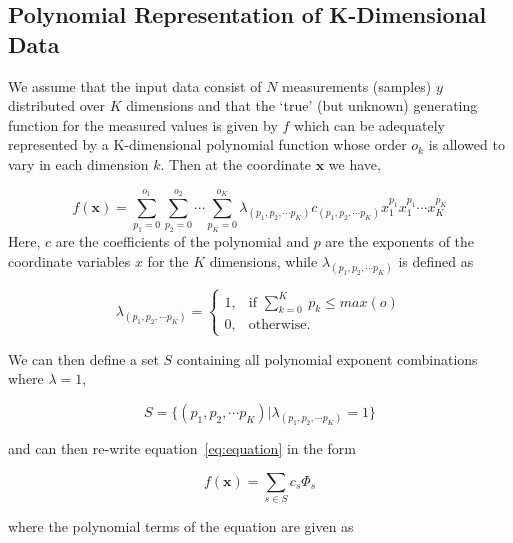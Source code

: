 \subsection{Polynomial Representation of K-Dimensional Data}
\label{subsec:polynomial-representation-of-k-dimensional-data}

We assume that the input data consist of $N$ measurements (samples) $y$
distributed over $K$ dimensions and that the `true' (but unknown) generating
function for the measured values is given by $f$ which can be adequately
represented by a K-dimensional polynomial function whose order $o_k$ is allowed
to vary in each dimension $k$.
Then at the coordinate $\bm{x}$ we have,

\begin{equation}
    f(\bm{x}) = \sum_{p_1 = 0}^{o_1}
                \sum_{p_2 = 0}^{o_2}
                \cdots \sum_{p_K = 0}^{o_K}
                \lambda_{(p_1, p_2,\cdots p_K)}
                c_{(p_1, p_2,\cdots p_K)}
                x_1^{p_1} x_1^{p_1} \cdots x_K^{p_K}\label{eq:equation}
\end{equation}
Here, $c$  are the coefficients of the polynomial and $p$ are the exponents of
the coordinate variables $x$ for the $K$ dimensions, while
$\lambda_{(p_1, p_2,\cdots p_K)}$ is defined as

\begin{equation}
    \lambda_{(p_1, p_2,\cdots p_K)} = \left\{
        \begin{array}{rl}
            1, & \textrm{if } \sum_{k = 0}^{K} ~ p_k \leq max(o) \\
            0, & \textrm{otherwise.}
        \end{array} \right.
    \label{eq:equation2}
\end{equation}

We can then define a set $S$ containing all polynomial exponent combinations
where $\lambda = 1$,

\begin{equation}
    S = \{ (p_1, p_2,\cdots p_K) | \lambda_{(p_1, p_2,\cdots p_K)} = 1 \}
    \label{eq:equation3}
\end{equation}

and can then re-write equation~\ref{eq:equation} in the form

\begin{equation}
    f(\bm{x})  =  \sum_{s \in S} c_s \Phi_s\label{eq:equation4}
\end{equation}

where the polynomial terms of the equation are given as

